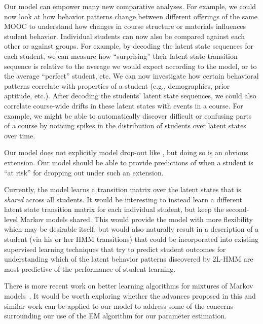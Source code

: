 Our model can empower many new comparative analyses. For example, we could
now look at how behavior patterns change between different offerings of
the same MOOC to understand how changes in course structure or materials
influences student behavior. Individual students can now also be compared
against each other or against groups. For example, by decoding the latent
state sequences for each student, we can measure how ``surprising'' their
latent state transition sequence is relative to the average we would expect
according to the model, or to the average ``perfect'' student, etc. We can
now investigate how certain behavioral patterns correlate with properties
of a student (e.g., demographics, prior aptitude, etc.). After decoding the
students' latent state sequences, we could also correlate course-wide
drifts in these latent states with events in a course. For example, we
might be able to automatically discover difficult or confusing parts of a
course by noticing spikes in the distribution of students over latent
states over time.

Our model does not explicitly model drop-out like
\citet{Kizilcec:2013:LAK}, but doing so is an obvious extension. Our model
should be able to provide predictions of when a student is ``at risk'' for
dropping out under such an extension.

Currently, the model learns a transition matrix over the latent states that
is \emph{shared} across all students. It would be interesting to instead
learn a different latent state transition matrix for each individual
student, but keep the second-level Markov models shared. This would provide
the model with more flexibility which may be desirable itself, but would
also naturally result in a description of a student (via his or her HMM
transitions) that could be incorporated into existing supervised learning
techniques that try to predict student outcomes for understanding
which of the latent behavior patterns discovered by 2L-HMM are most predictive
of the performance of student learning.

There is more recent work on better learning algorithms for mixtures of
Markov models~\citep{Gupta:2016:NIPS}. It would be worth exploring whether
the advances proposed in this and similar work can be applied to our model
to address some of the concerns surrounding our use of the EM algorithm for
our parameter estimation.
